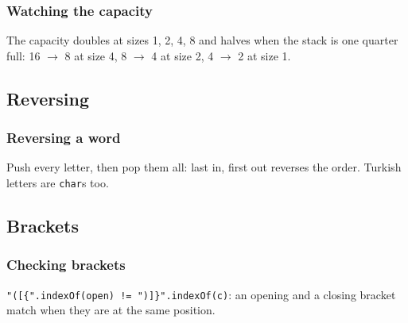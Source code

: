 \documentclass[aspectratio=169,10pt,compress]{beamer}
\begin{document}
\begin{frame}[t,fragile] \frametitle{Watching the capacity}

  \vspace{0.2em}
  \small The capacity doubles at sizes 1, 2, 4, 8 and halves when the stack is one quarter full: 16 $\to$ 8 at size 4, 8 $\to$ 4 at size 2, 4 $\to$ 2 at size 1.
\end{frame}


\subsection[Reverse]{Reversing}




\begin{frame}[t,fragile] \frametitle{Reversing a word}

  \vspace{0.2em}
  \small Push every letter, then pop them all: last in, first out reverses the order. Turkish letters are \texttt{char}s too.
\end{frame}

\subsection[Brackets]{Brackets}




\begin{frame}[t,fragile] \frametitle{Checking brackets}

  \vspace{0.2em}
  \small \texttt{"([\{".indexOf(open) != ")]\}".indexOf(c)}: an opening and a closing bracket match when they are at the same position.
\end{frame}
\end{document}
